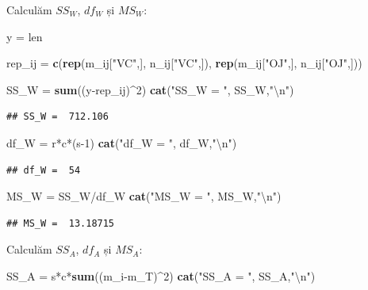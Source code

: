 \documentclass[]{article}
\newenvironment{Shaded}{\begin{snugshade}}{\end{snugshade}}
\newcommand{\KeywordTok}[1]{\textcolor[rgb]{0.13,0.29,0.53}{\textbf{{#1}}}}
\newcommand{\DecValTok}[1]{\textcolor[rgb]{0.00,0.00,0.81}{{#1}}}
\newcommand{\CharTok}[1]{\textcolor[rgb]{0.31,0.60,0.02}{{#1}}}
\newcommand{\StringTok}[1]{\textcolor[rgb]{0.31,0.60,0.02}{{#1}}}
\newcommand{\NormalTok}[1]{{#1}}
\begin{document}
Calculăm \(SS_W\), \(df_W\) și \(MS_W\):

\begin{Shaded}
\begin{Highlighting}[]
\NormalTok{y =}\StringTok{ }\NormalTok{len}

\NormalTok{rep_ij =}\StringTok{ }\KeywordTok{c}\NormalTok{(}\KeywordTok{rep}\NormalTok{(m_ij[}\StringTok{"VC"}\NormalTok{,], n_ij[}\StringTok{"VC"}\NormalTok{,]), }\KeywordTok{rep}\NormalTok{(m_ij[}\StringTok{"OJ"}\NormalTok{,], n_ij[}\StringTok{"OJ"}\NormalTok{,]))}

\NormalTok{SS_W =}\StringTok{ }\KeywordTok{sum}\NormalTok{((y-rep_ij)^}\DecValTok{2}\NormalTok{)}
\KeywordTok{cat}\NormalTok{(}\StringTok{"SS_W = "}\NormalTok{, SS_W,}\StringTok{"}\CharTok{\textbackslash{}n}\StringTok{"}\NormalTok{)}
\end{Highlighting}
\end{Shaded}

\begin{verbatim}
## SS_W =  712.106
\end{verbatim}

\begin{Shaded}
\begin{Highlighting}[]
\NormalTok{df_W =}\StringTok{ }\NormalTok{r*c*(s}\DecValTok{-1}\NormalTok{)}
\KeywordTok{cat}\NormalTok{(}\StringTok{"df_W = "}\NormalTok{, df_W,}\StringTok{"}\CharTok{\textbackslash{}n}\StringTok{"}\NormalTok{)}
\end{Highlighting}
\end{Shaded}

\begin{verbatim}
## df_W =  54
\end{verbatim}

\begin{Shaded}
\begin{Highlighting}[]
\NormalTok{MS_W =}\StringTok{ }\NormalTok{SS_W/df_W}
\KeywordTok{cat}\NormalTok{(}\StringTok{"MS_W = "}\NormalTok{, MS_W,}\StringTok{"}\CharTok{\textbackslash{}n}\StringTok{"}\NormalTok{)}
\end{Highlighting}
\end{Shaded}

\begin{verbatim}
## MS_W =  13.18715
\end{verbatim}

Calculăm \(SS_A\), \(df_A\) și \(MS_A\):

\begin{Shaded}
\begin{Highlighting}[]
\NormalTok{SS_A =}\StringTok{ }\NormalTok{s*c*}\KeywordTok{sum}\NormalTok{((m_i-m_T)^}\DecValTok{2}\NormalTok{)}
\KeywordTok{cat}\NormalTok{(}\StringTok{"SS_A = "}\NormalTok{, SS_A,}\StringTok{"}\CharTok{\textbackslash{}n}\StringTok{"}\NormalTok{)}
\end{Highlighting}
\end{Shaded}
\end{document}
